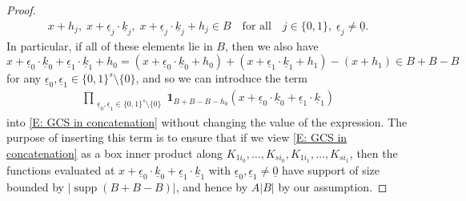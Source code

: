 \documentclass[11pt]{amsart}
\theoremstyle{definition}
\newcommand{\uk}{{\underline{k}}}
\newcommand{\ueps}{{\underline{\epsilon}}}
\DeclareMathOperator{\supp}{supp}
\begin{document}
\begin{proof}
\begin{align*}
        x+h_j,\; x + \ueps_j\cdot \uk_j,\; x + \ueps_j\cdot \uk_j + h_j\in B\quad \textrm{for all}\quad j\in\{0,1\},\; \ueps_j\neq \underline{0}.
    \end{align*}
    In particular, if all of these elements lie in $B$, then we also have
    $$x+\ueps_0\cdot\uk_0 + \ueps_1\cdot \uk_1 + h_0=(x+\ueps_0\cdot\uk_0+h_0)+(x+ \ueps_1\cdot \uk_1 + h_1)-(x+h_1) \in B+B-B$$
    for any $\ueps_0, \ueps_1\in\{0,1\}^s\setminus{\{0\}}$,
    and so we can introduce the term
    \begin{align}\label{E: product of inserted indicator functions}
        \prod_{\substack{\ueps_0, \ueps_1\in\{0,1\}^s\setminus{\{0\}}}} 
        \mathbf{1}_{B+B-B-h_0}(x+\ueps_0\cdot\uk_0 + \ueps_1\cdot\uk_1)
    \end{align}
    into \eqref{E: GCS in concatenation} without changing the value of the expression. The purpose of inserting this term is to ensure that if we view \eqref{E: GCS in concatenation} as a box inner product along $K_{1i_0}, \ldots, K_{si_0}, K_{1i_1}, \ldots, K_{si_1}$, then the functions evaluated at $x+\ueps_0\cdot\uk_0 + \ueps_1\cdot \uk_1$ with $\ueps_0, \ueps_1\neq \underline{0}$ have support of size bounded by $|\supp(B+B-B)|$, and hence by $A|B|$ by our assumption. 


\end{proof}
\end{document}

